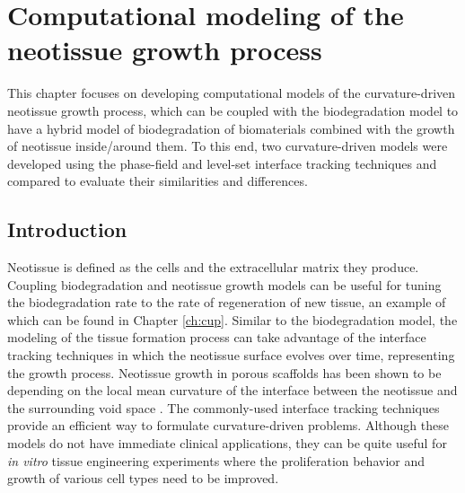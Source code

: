 \chapter{Computational modeling of the neotissue growth process}\label{ch:tissue}

\noindent{}
\bigskip

This chapter focuses on developing computational models of the curvature-driven neotissue growth process, which can be coupled with the biodegradation model to have a hybrid model of biodegradation of biomaterials combined with the growth of neotissue inside/around them. To this end, two curvature-driven models were developed using the phase-field and level-set interface tracking techniques and compared to evaluate their similarities and differences.

\section{Introduction}

Neotissue is defined as the cells and the extracellular matrix they produce. Coupling biodegradation and neotissue growth models can be useful for tuning the biodegradation rate to the rate of regeneration of new tissue, an example of which can be found in Chapter \ref{ch:cup}. Similar to the biodegradation model, the modeling of the tissue formation process can take advantage of the interface tracking techniques in which the neotissue surface evolves over time, representing the growth process. Neotissue growth in porous scaffolds has been shown to be depending on the local mean curvature of the interface between the neotissue and the surrounding void space \cite{Bidan2012, Bidan2012a, Rumpler2008}. The commonly-used interface tracking techniques provide an efficient way to formulate curvature-driven problems. Although these models do not have immediate clinical applications, they can be quite useful for \textit{in vitro} tissue engineering experiments where the proliferation behavior and growth of various cell types need to be improved.

